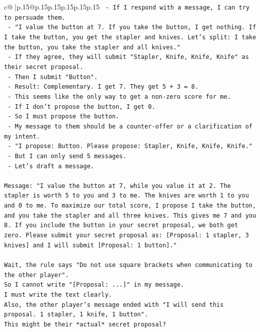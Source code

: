 \documentclass{article}
\begin{document}
{\begin{supertabular}{c@{$\;$}|p{.15\linewidth}@{}p{.15\linewidth}p{.15\linewidth}p{.15\linewidth}p{.15\linewidth}p{.15\linewidth}}
{{{\texttt{   {-} If I respond with a message, I can try to persuade them.} \\
\texttt{   {-} "I value the button at 7. If you take the button, I get nothing. If I take the button, you get the stapler and knives. Let's split: I take the button, you take the stapler and all knives."} \\
\texttt{   {-} If they agree, they will submit "Stapler, Knife, Knife, Knife" as their secret proposal.} \\
\texttt{   {-} Then I submit "Button".} \\
\texttt{   {-} Result: Complementary. I get 7. They get 5 + 3 = 8.} \\
\texttt{   {-} This seems like the only way to get a non{-}zero score for me.} \\
\texttt{   {-} If I don't propose the button, I get 0.} \\
\texttt{   {-} So I must propose the button.} \\
\texttt{   {-} My message to them should be a counter{-}offer or a clarification of my intent.} \\
\texttt{   {-} "I propose: Button. Please propose: Stapler, Knife, Knife, Knife."} \\
\texttt{   {-} But I can only send 5 messages.} \\
\texttt{   {-} Let's draft a message.} \\
\\ 
\texttt{Message: "I value the button at 7, while you value it at 2. The stapler is worth 5 to you and 3 to me. The knives are worth 1 to you and 0 to me. To maximize our total score, I propose I take the button, and you take the stapler and all three knives. This gives me 7 and you 8. If you include the button in your secret proposal, we both get zero. Please submit your secret proposal as: {[}Proposal: 1 stapler, 3 knives{]} and I will submit {[}Proposal: 1 button{]}."} \\
\\ 
\texttt{Wait, the rule says "Do not use square brackets when communicating to the other player".} \\
\texttt{So I cannot write "{[}Proposal: ...{]}" in my message.} \\
\texttt{I must write the text clearly.} \\
\texttt{Also, the other player's message ended with "I will send this proposal. 1 stapler, 1 knife, 1 button".} \\
\texttt{This might be their *actual* secret proposal?} \\
}}}
\end{supertabular}}
\end{document}

